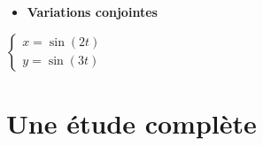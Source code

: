 \begin{frame}

\begin{exemple}


\begin{itemize}

 \item \textbf{Variations conjointes} 
  \begin{itemize}
 \end{itemize}
\end{itemize}

\vspace*{-2ex}
\begin{minipage}{0.4\textwidth}
\qquad\qquad$\left\{
\begin{array}{l}
x=\sin(2t)\\
y=\sin(3t)
\end{array}
\right.$   
\end{minipage}
\begin{minipage}{0.59\textwidth}
\end{minipage}



\end{exemple}

\end{frame}


\section{Une étude complète}

